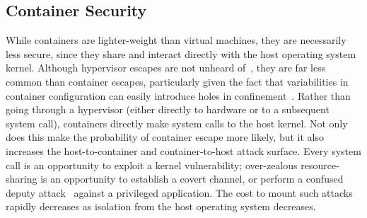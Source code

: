 

\subsection{Container Security}%
\label{ss:container-security-bg}

While containers are lighter-weight than virtual machines, they are necessarily less
secure, since they share and interact directly with the host operating system kernel.
Although hypervisor escapes are not unheard of~\cite{dubrelle2015_hypervisor,
eder2016_hypervisor_container}, they are far less common than container escapes,
particularly given the fact that variabilities in container configuration can easily
introduce holes in confinement~\cite{sultan2019_container_security}. Rather than going
through a hypervisor (either directly to hardware or to a subsequent system call),
containers directly make system calls to the host kernel. Not only does this make the
probability of container escape more likely, but it also increases the host-to-container
and container-to-host attack surface. Every system call is an opportunity to exploit
a kernel vulnerability; over-zealous resource-sharing is an opportunity to establish
a covert channel, or perform a confused deputy attack~\cite{hardy1988_confused_deputy}
against a privileged application. The cost to mount such attacks rapidly decreases as
isolation from the host operating system decreases.

